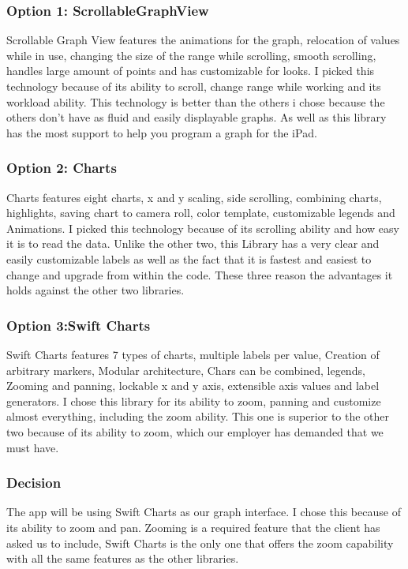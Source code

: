 \documentclass[onecolumn, draftclsnofoot,10pt, compsoc]{IEEEtran}
\begin{document}
\subsubsection{Option 1: ScrollableGraphView}
Scrollable Graph View features the animations for the graph, relocation of values while in use, changing the size of the range while scrolling, smooth scrolling, handles large amount of points and has customizable for looks. \cite{Github3}
 I picked this technology because of its ability to scroll, change range while working and its workload ability.
This technology is better than the others i chose because the others don't have as fluid and easily displayable graphs.
 As well as this library has the most support to help you program a graph for the iPad.


\subsubsection{Option 2: Charts}
	Charts features eight charts, x and y scaling, side scrolling, combining charts, highlights, saving chart to camera roll, color template, customizable legends and Animations. \cite{Github4}
I picked this technology because of its scrolling ability and how easy it is to read the data.
Unlike the other two, this Library has a very clear and easily customizable labels as well as the fact that it is fastest and easiest to change and upgrade from within the code.
 These three reason the advantages it holds against the other two libraries.
\subsubsection{Option 3:Swift Charts}
	Swift Charts features 7 types of charts, multiple labels per value, Creation of arbitrary markers, Modular architecture, Chars can be combined, legends, Zooming and panning, lockable x and y axis, extensible axis values and label generators. \cite{Github5}
I chose this library for its ability to zoom, panning and customize almost everything, including the zoom ability.
 This one is superior to the other two because of its ability to zoom, which our employer has demanded that we must have.
\subsubsection{Decision }
The app will be using Swift Charts as our graph interface.
 I chose this because of its ability to zoom and pan.
 Zooming is a required feature that the client has asked us to include, Swift Charts is the only one that offers the zoom capability with all the same features as the other libraries.
\end{document}
